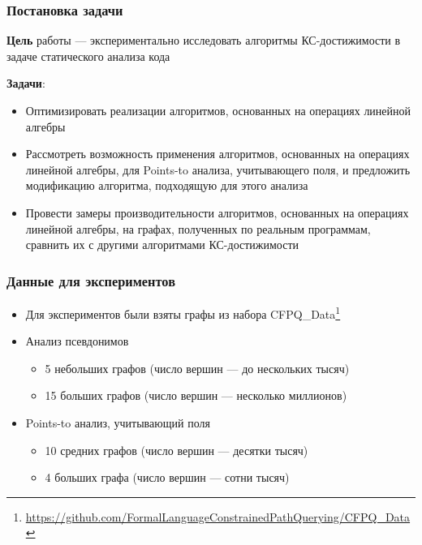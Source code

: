 \documentclass[x11names,dvipsnames,table,aspectratio=169]{beamer}
\begin{document}
            
\begin{frame}
  \transwipe[direction=90]
  \frametitle{Постановка задачи}
  
  \textbf{Цель} работы --- экспериментально исследовать алгоритмы КС-достижимости в задаче статического анализа кода

  \textbf{Задачи}:
  \begin{itemize}
    \item Оптимизировать реализации алгоритмов, основанных на операциях линейной алгебры
    \item Рассмотреть возможность применения алгоритмов, основанных на операциях линейной алгебры, для Points-to анализа, учитывающего поля, и предложить модификацию алгоритма, подходящую для этого анализа
    \item Провести замеры производительности алгоритмов, основанных на операциях линейной алгебры, на графах, полученных по реальным программам, сравнить их с другими алгоритмами КС-достижимости
  \end{itemize}
\end{frame}


\begin{frame}
  \transwipe[direction=90]
  \frametitle{Данные для экспериментов}
  \begin{itemize}
    \item Для экспериментов были взяты графы из набора CFPQ\_Data\footnote{\url{https://github.com/FormalLanguageConstrainedPathQuerying/CFPQ_Data}}
    \item Анализ псевдонимов
    \begin{itemize}
        \item 5 небольших графов (число вершин --- до нескольких тысяч)
        \item 15 больших графов (число вершин --- несколько миллионов)
    \end{itemize}
    \item Points-to анализ, учитывающий поля
    \begin{itemize}
        \item 10 средних графов (число вершин --- десятки тысяч)
        \item 4 больших графа (число вершин --- сотни тысяч)
    \end{itemize}
  \end{itemize}
\end{frame}
\end{document}
